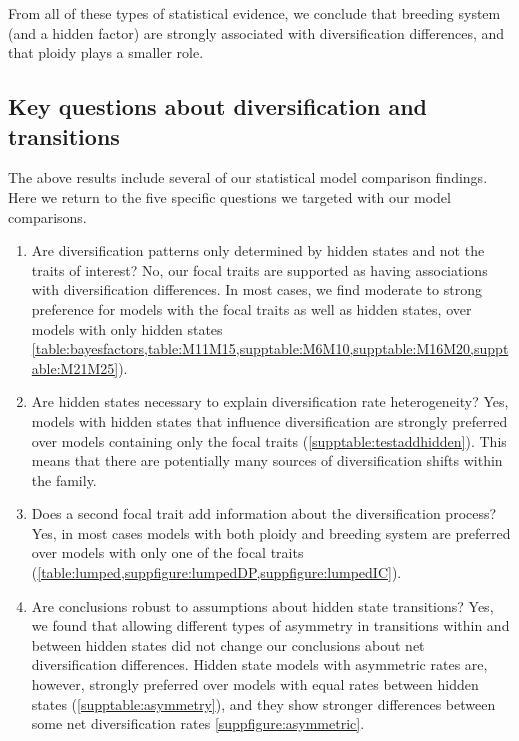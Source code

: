 From all of these types of statistical evidence, we conclude that breeding system (and a hidden factor) are strongly associated with diversification differences, and that ploidy plays a smaller role.

\subsection{Key questions about diversification and transitions}

The above results include several of our statistical model comparison findings.
Here we return to the five specific questions we targeted with our model comparisons.

\begin{enumerate}

    \item Are diversification patterns only determined by hidden states and not the traits of interest?
    No, our focal traits are supported as having associations with diversification differences.
    In most cases, we find moderate to strong preference for models with the focal traits as well as hidden states, over models with only hidden states \cref{table:bayesfactors,table:M11M15,supptable:M6M10,supptable:M16M20,supptable:M21M25}).

    \item Are hidden states necessary to explain diversification rate heterogeneity?
    Yes, models with hidden states that influence diversification are strongly preferred over models containing only the focal traits (\cref{supptable:testaddhidden}).
    This means that there are potentially many sources of diversification shifts within the family.

    \item Does a second focal trait add information about the diversification process?
    Yes, in most cases models with both ploidy and breeding system are preferred over models with only one of the focal traits (\cref{table:lumped,suppfigure:lumpedDP,suppfigure:lumpedIC}).

    \item Are conclusions robust to assumptions about hidden state transitions?
    Yes, we found that allowing different types of asymmetry in transitions within and between hidden states did not change our conclusions about net diversification differences.
    Hidden state models with asymmetric rates are, however, strongly preferred over models with equal rates between hidden states (\cref{supptable:asymmetry}), and they show stronger differences between some net diversification rates \cref{suppfigure:asymmetric}.


\end{enumerate}
